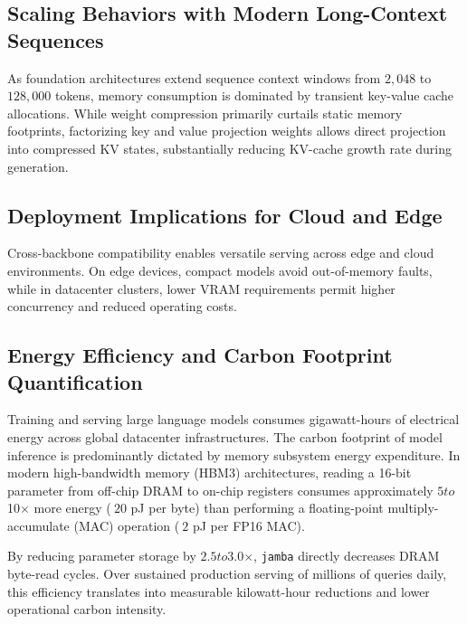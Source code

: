 \subsection{Scaling Behaviors with Modern Long-Context Sequences}
As foundation architectures extend sequence context windows from $2{,}048$ to $128{,}000$ tokens, memory consumption is dominated by transient key-value cache allocations. While weight compression primarily curtails static memory footprints, factorizing key and value projection weights allows direct projection into compressed KV states, substantially reducing KV-cache growth rate during generation.

\subsection{Deployment Implications for Cloud and Edge}
Cross-backbone compatibility enables versatile serving across edge and cloud environments. On edge devices, compact models avoid out-of-memory faults, while in datacenter clusters, lower VRAM requirements permit higher concurrency and reduced operating costs.

\subsection{Energy Efficiency and Carbon Footprint Quantification}
Training and serving large language models consumes gigawatt-hours of electrical energy across global datacenter infrastructures. The carbon footprint of model inference is predominantly dictated by memory subsystem energy expenditure. In modern high-bandwidth memory (HBM3) architectures, reading a 16-bit parameter from off-chip DRAM to on-chip registers consumes approximately $5$\times$ to $10$\times$ more energy ($~20$ pJ per byte) than performing a floating-point multiply-accumulate (MAC) operation ($~2$ pJ per FP16 MAC).

By reducing parameter storage by $2.5$\times$ to $3.0$\times$, \texttt{jamba} directly decreases DRAM byte-read cycles. Over sustained production serving of millions of queries daily, this efficiency translates into measurable kilowatt-hour reductions and lower operational carbon intensity.

